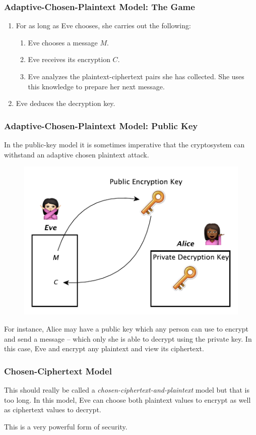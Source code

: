 \documentclass{beamer}
\newcommand{\<}{\langle}
\renewcommand{\>}{\rangle}
\begin{document}
\begin{frame}
\frametitle{Adaptive-Chosen-Plaintext Model: The Game}

\begin{enumerate}
\item For as long as Eve chooses, she carries out the following:
	\begin{enumerate}
	\item Eve chooses a message $M$.
	\item Eve receives its encryption $C$.
	\item Eve analyzes the plaintext-ciphertext pairs she has collected. She uses this knowledge to prepare her next message. 
	\end{enumerate}
\item Eve deduces the decryption key.
\end{enumerate}
\end{frame}

\begin{frame}
\frametitle{Adaptive-Chosen-Plaintext Model: Public Key}
\small
In the public-key model it is sometimes imperative that the cryptosystem can withstand an adaptive chosen plaintext attack.
\begin{figure}
\includegraphics[scale=.5]{IMG/KPAattack.pdf}
\end{figure}\tiny
For instance, Alice may have a public key which any person can use to encrypt and send a message -- which only she is able to decrypt using the private key. In this case, Eve and encrypt any plaintext and view its ciphertext.
\end{frame}


\begin{frame}
\frametitle{Chosen-Ciphertext Model}

This should really be called a \emph{chosen-ciphertext-and-plaintext} model but that is too long. In this model, Eve can choose both plaintext values to encrypt as well as ciphertext values to decrypt.\newline

This is a very powerful form of security. 
\end{frame}
\end{document}
